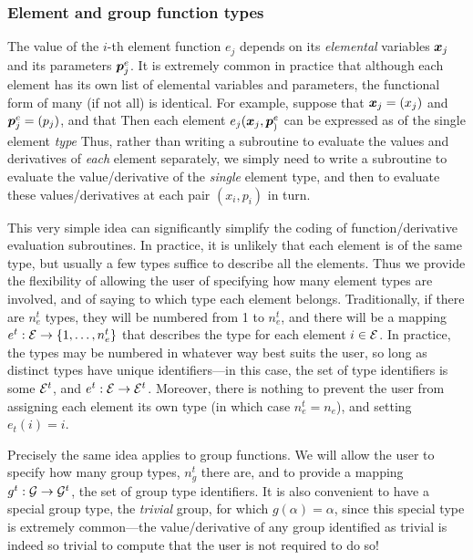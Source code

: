 \documentclass{galahad}
\begin{document}

\subsubsection{Element and group function types\label{ft}}

The value of the $i$-th element function $e_j$ depends on its {\em elemental}
variables ${\bm{x}}_j$ and its parameters ${\bm{p}}^e_j$. It is extremely
common in practice that although each element has its own list of
elemental variables and parameters, the functional form of many (if not
all) is identical. For example, suppose that
${\bm{x}}_j = ( x_j )$ and ${\bm{p}}^e_j = ( p_j )$,
and that
Then each element $e_j({\bm{x}}_j, {\bm{p}}^e_)$ can be expressed as
of the single element {\em type}
Thus, rather than writing a subroutine to evaluate
the values and derivatives of {\em each} element separately, we simply need to
write a subroutine to evaluate the value/derivative of the {\em single}
element type, and then to evaluate these values/derivatives at each
pair  $(x_i, p_i)$ in turn.

This very simple idea can significantly simplify the coding of
function/derivative evaluation subroutines. In practice, it is unlikely
that each element is of the same type, but usually a few types
suffice to describe all the elements. Thus we provide the flexibility
of allowing the user of specifying how many element types are involved,
and of saying to which type each element belongs. Traditionally,
if there are $n^t_e$ types, they will be numbered from 1 to $n^t_e$,
and there will be a mapping $e^t: \calE \rightarrow \{1,  \ldots, n_e^t \}$
that describes the type for each
element $i \in \calE$. In practice, the types may be numbered in whatever
way best suits the user, so long as distinct types have unique
identifiers---in this case, the set of type identifiers is some $\calE^t$, and
$e^t: \calE \rightarrow \calE^t$.
Moreover, there is nothing to prevent the user from assigning each
element its own type (in which case $n^t_e = n_e$), and setting $e_t(i) = i$.

Precisely the same idea applies to group functions. We will allow the user
to specify how many group types, $n^t_g$ there are, and to provide a
mapping $g^t: \calG \rightarrow \calG^t$, the set of group type identifiers.
It is also convenient to have a special group type,
the {\em trivial} group, for which $g(\alpha) = \alpha$, since
this special type is extremely common---the value/derivative of any group
identified as trivial is indeed so trivial to compute that the user
is not required to do so!
\end{document}
